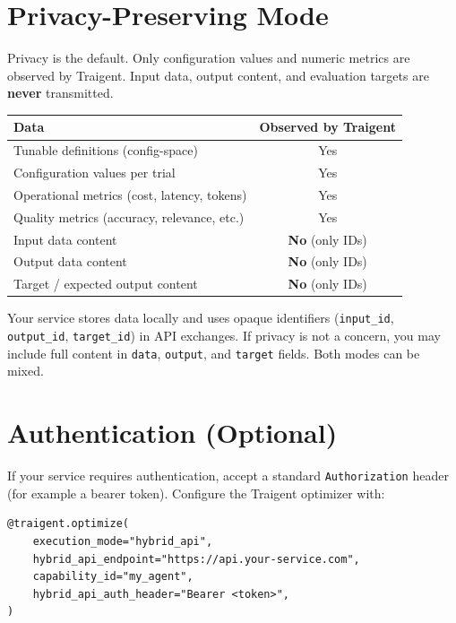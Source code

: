 \documentclass[11pt,a4paper]{article}
\newcommand{\field}[1]{\texttt{#1}}
\begin{document}
\section{Privacy-Preserving Mode}\label{sec:privacy}

Privacy is the default. Only configuration values and numeric metrics are
observed by Traigent. Input data, output content, and evaluation targets are
\textbf{never} transmitted.

\begin{center}
\small
\begin{tabular}{@{}lc@{}}
\toprule
\textbf{Data} & \textbf{Observed by Traigent} \\
\midrule
Tunable definitions (config-space)             & Yes \\
Configuration values per trial                 & Yes \\
Operational metrics (cost, latency, tokens)    & Yes \\
Quality metrics (accuracy, relevance, etc.)    & Yes \\
Input data content                             & \textcolor{privacygreen}{\textbf{No}} (only IDs) \\
Output data content                            & \textcolor{privacygreen}{\textbf{No}} (only IDs) \\
Target / expected output content               & \textcolor{privacygreen}{\textbf{No}} (only IDs) \\
\bottomrule
\end{tabular}
\end{center}

Your service stores data locally and uses opaque identifiers
(\field{input\_id}, \field{output\_id}, \field{target\_id}) in API exchanges.
If privacy is not a concern, you may include full content in \field{data},
\field{output}, and \field{target} fields. Both modes can be mixed.

\section{Authentication (Optional)}

If your service requires authentication, accept a standard
\texttt{Authorization} header (for example a bearer token). Configure the
Traigent optimizer with:

\begin{lstlisting}[basicstyle=\ttfamily\small]
@traigent.optimize(
    execution_mode="hybrid_api",
    hybrid_api_endpoint="https://api.your-service.com",
    capability_id="my_agent",
    hybrid_api_auth_header="Bearer <token>",
)
\end{lstlisting}
\end{document}
